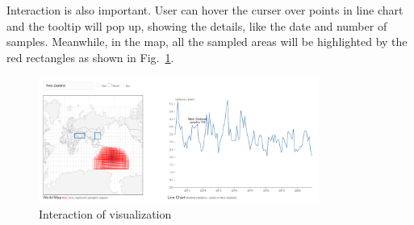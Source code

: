 \documentclass[conference]{IEEEtran}
\begin{document}
Interaction is also important. User can hover the curser over points in line chart and the tooltip will pop up, showing the details, like the date and number of samples. Meanwhile, in the map, all the sampled areas will be highlighted by the red rectangles as shown in Fig.~\ref{iov}.

\begin{figure}[htbp]
    \centerline{\includegraphics[width=260pt]{images/Interaction_of_visualization.png}}
    \caption{Interaction of visualization}
    \label{iov}
\end{figure}
\end{document}

